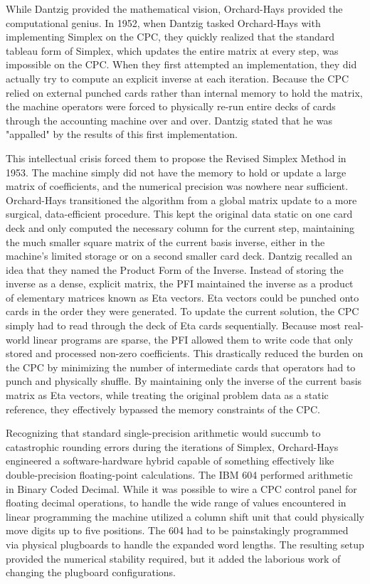 While Dantzig provided the mathematical vision, Orchard-Hays provided the computational genius. In 1952, when Dantzig tasked Orchard-Hays with implementing Simplex on the CPC, they quickly realized that the standard tableau form of Simplex, which updates the entire matrix at every step, was impossible on the CPC. When they first attempted an implementation, they did actually try to compute an explicit inverse at each iteration. Because the CPC relied on external punched cards rather than internal memory to hold the matrix, the machine operators were forced to physically re-run entire decks of cards through the accounting machine over and over. Dantzig stated that he was "appalled" by the results of this first implementation. 

This intellectual crisis forced them to propose the Revised Simplex Method in 1953. The machine simply did not have the memory to hold or update a large matrix of coefficients, and the numerical precision was nowhere near sufficient. Orchard-Hays transitioned the algorithm from a global matrix update to a more surgical, data-efficient procedure. This kept the original data static on one card deck and only computed the necessary column for the current step, maintaining the much smaller square matrix of the current basis inverse, either in the machine's limited storage or on a second smaller card deck. Dantzig recalled an idea that they named the Product Form of the Inverse. Instead of storing the inverse as a dense, explicit matrix, the PFI maintained the inverse as a product of elementary matrices known as Eta vectors. Eta vectors could be punched onto cards in the order they were generated. To update the current solution, the CPC simply had to read through the deck of Eta cards sequentially. Because most real-world linear programs are sparse, the PFI allowed them to write code that only stored and processed non-zero coefficients. This drastically reduced the burden on the CPC by minimizing the number of intermediate cards that operators had to punch and physically shuffle. By maintaining only the inverse of the current basis matrix as Eta vectors, while treating the original problem data as a static reference, they effectively bypassed the memory constraints of the CPC.
 
Recognizing that standard single-precision arithmetic would succumb to catastrophic rounding errors during the iterations of Simplex, Orchard-Hays engineered a software-hardware hybrid capable of something effectively like double-precision floating-point calculations. The IBM 604 performed arithmetic in Binary Coded Decimal. While it was possible to wire a CPC control panel for floating decimal operations, to handle the wide range of values encountered in linear programming the machine utilized a column shift unit that could physically move digits up to five positions. The 604 had to be painstakingly programmed via physical plugboards to handle the expanded word lengths. The resulting setup provided the numerical stability required, but it added the laborious work of changing the plugboard configurations. 

